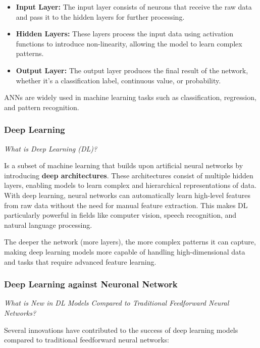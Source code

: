 \documentclass{llncs}
\begin{document}
\begin{itemize}
	\item \textbf{Input Layer:} The input layer consists of neurons that receive the raw data and pass it to the hidden layers for further processing.
	\item \textbf{Hidden Layers:} These layers process the input data using activation functions to introduce non-linearity, allowing the model to learn complex patterns.
	\item \textbf{Output Layer:} The output layer produces the final result of the network, whether it's a classification label, continuous value, or probability.
\end{itemize}

ANNs are widely used in machine learning tasks such as classification, regression, and pattern recognition.\cite{aiml2024}

\subsubsection{Deep Learning}

\textit{What is Deep Learning (DL)?}

Is a subset of machine learning that builds upon artificial neural networks by introducing \textbf{deep architectures}. These architectures consist of multiple hidden layers, enabling models to learn complex and hierarchical representations of data. With deep learning, neural networks can automatically learn high-level features from raw data without the need for manual feature extraction. This makes DL particularly powerful in fields like computer vision, speech recognition, and natural language processing.\cite{turing}

The deeper the network (more layers), the more complex patterns it can capture, making deep learning models more capable of handling high-dimensional data and tasks that require advanced feature learning.

\subsubsection{Deep Learning against Neuronal Network}

\textit{What is New in DL Models Compared to Traditional Feedforward Neural Networks?}

Several innovations have contributed to the success of deep learning models compared to traditional feedforward neural networks:\cite{turing}
\end{document}

